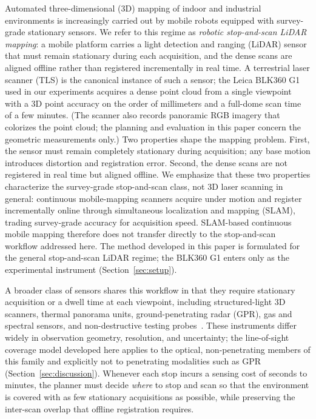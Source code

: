 \documentclass[sensors,article,submit,pdftex,moreauthors]{Definitions/mdpi}
\begin{document}
Automated three-dimensional (3D) mapping of indoor and industrial environments
is increasingly carried out by mobile robots equipped with survey-grade
stationary sensors. We refer to this regime as \emph{robotic stop-and-scan
LiDAR mapping}: a mobile platform carries a light detection and ranging (LiDAR)
sensor that must remain stationary during each acquisition, and the dense scans
are aligned offline rather than registered incrementally in real time. A
terrestrial laser scanner (TLS) is the canonical instance of such a sensor; the
Leica BLK360 G1~\cite{leica-blk360} used in our experiments acquires a dense
point cloud from a single viewpoint with a 3D point accuracy on the order of
millimeters and a full-dome scan time of a few minutes. (The scanner also
records panoramic RGB imagery that colorizes the point cloud; the planning and
evaluation in this paper concern the geometric measurements only.) Two
properties shape the mapping problem. First, the sensor must remain completely
stationary during acquisition; any base motion introduces distortion and
registration error. Second, the dense scans are not registered in real time but
aligned offline. We emphasize that these two properties characterize the
survey-grade stop-and-scan class, not 3D laser scanning in general: continuous
mobile-mapping scanners acquire under motion and register incrementally online
through simultaneous localization and mapping (SLAM), trading survey-grade
accuracy for acquisition speed. SLAM-based continuous mobile mapping therefore
does not transfer directly to the stop-and-scan workflow addressed here. The method developed in this
paper is formulated for the general stop-and-scan LiDAR regime; the BLK360 G1
enters only as the experimental instrument (Section~\ref{sec:setup}).

A broader class of sensors shares this workflow in that they require
stationary acquisition or a dwell time at each viewpoint, including
structured-light 3D scanners, thermal panorama units, ground-penetrating radar
(GPR), gas and spectral sensors, and non-destructive testing
probes~\cite{stopandgo-review,gas-coverage,robotic-ndt}. These instruments
differ widely in observation geometry, resolution, and uncertainty; the
line-of-sight coverage model developed here applies to the optical,
non-penetrating members of this family and explicitly not to penetrating
modalities such as GPR (Section~\ref{sec:discussion}). Whenever
each stop incurs a sensing cost of seconds to minutes, the planner must decide
\emph{where} to stop and scan so that the environment is covered with as few
stationary acquisitions as possible, while preserving the inter-scan overlap that
offline registration requires.
\end{document}
